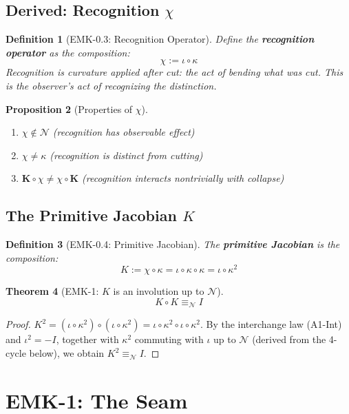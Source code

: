 \documentclass[12pt, oneside]{article}
\newtheorem{theorem}{Theorem}[section]
\newtheorem{proposition}[theorem]{Proposition}
\newtheorem{definition}[theorem]{Definition}
\newcommand{\K}{\mathbf{K}}
\newcommand{\N}{\mathcal{N}}
\begin{document}
\subsection{Derived: Recognition $\chi$}

\begin{definition}[EMK-0.3: Recognition Operator]
Define the \textbf{recognition operator} as the composition:
\[
\boxed{\chi := \iota \circ \kappa}
\]
Recognition is curvature applied after cut: the act of bending what was cut. This is the observer's act of recognizing the distinction.
\end{definition}

\begin{proposition}[Properties of $\chi$]
\begin{enumerate}
    \item $\chi \notin \N$ (recognition has observable effect)
    \item $\chi \neq \kappa$ (recognition is distinct from cutting)
    \item $\K \circ \chi \neq \chi \circ \K$ (recognition interacts nontrivially with collapse)
\end{enumerate}
\end{proposition}

\subsection{The Primitive Jacobian $K$}

\begin{definition}[EMK-0.4: Primitive Jacobian]
The \textbf{primitive Jacobian} is the composition:
\[
\boxed{K := \chi \circ \kappa = \iota \circ \kappa \circ \kappa = \iota \circ \kappa^2}
\]
\end{definition}

\begin{theorem}[EMK-1: $K$ is an involution up to $\N$]
\[
K \circ K \equiv_\N I
\]
\end{theorem}
\begin{proof}
$K^2 = (\iota \circ \kappa^2) \circ (\iota \circ \kappa^2) = \iota \circ \kappa^2 \circ \iota \circ \kappa^2$.
By the interchange law (A1-Int) and $\iota^2 = -I$, together with $\kappa^2$ commuting with $\iota$ up to $\N$ (derived from the 4-cycle below), we obtain $K^2 \equiv_\N I$.
\end{proof}

\section{EMK-1: The Seam}
\end{document}

